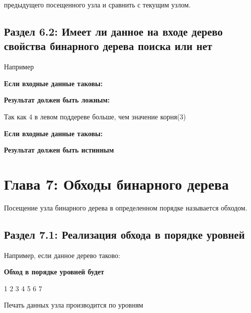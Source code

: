 
предыдущего посещенного узла и сравнить с текущим узлом.

\section*{Раздел 6.2: Имеет ли данное на входе дерево свойства \newline бинарного дерева поиска или нет}

Например

\vspace{\baselineskip}
\textbf{Если входные данные таковы:}

\vspace{\baselineskip}
\vspace{-0.3cm}

\textbf{Результат должен быть ложным:}

\vspace{\baselineskip}
Так как 4 в левом поддереве больше, чем значение корня(3)

\vspace{\baselineskip}
\textbf{Если входные данные таковы:}


\vspace{-0.5cm}
\textbf{Результат должен быть истинным}

\chapter*{Глава 7: Обходы бинарного дерева}
\vspace{-0.3cm}
Посещение узла бинарного дерева в определенном порядке называется обходом.

\vspace{\baselineskip}
\vspace{-0.4cm}
\section*{Раздел 7.1: Реализация обхода в порядке уровней}
Например, если данное дерево таково:


\textbf{Обход в порядке уровней будет}

\vspace{\baselineskip}
1 2 3 4 5 6 7

\vspace{\baselineskip}
Печать данных узла производится по уровням

